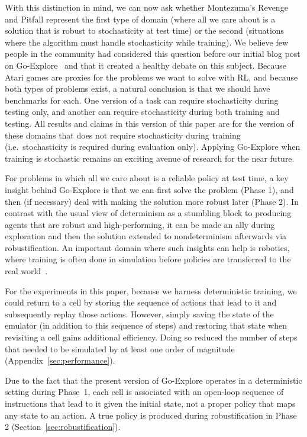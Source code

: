 \documentclass{article}
\begin{document}
With this distinction in mind, we can now ask whether Montezuma's Revenge and Pitfall represent the first type of domain (where all we care about is a solution that is robust to stochasticity at test time) or the second (situations where the algorithm must handle stochasticity while training). We believe few people in the community had considered this question before our initial blog post on Go-Explore~\cite{ecoffet:bloggoexplore2018} and that it created a healthy debate on this subject. Because Atari games are proxies for the problems we want to solve with RL, and because both types of problems exist, a natural conclusion is that we should have benchmarks for each. One version of a task can require stochasticity during testing only, and another can require stochasticity during both training and testing. All results and claims in this version of this paper are for the version of these domains that does not require stochasticity during training (i.e.\ stochasticity is required during evaluation only). Applying Go-Explore when training is stochastic remains an exciting avenue of research for the near future.

For problems in which all we care about is a reliable policy at test time, a key insight behind Go-Explore is that we can first solve the problem (Phase 1), and then (if necessary) deal with making the solution more robust later (Phase 2). In contrast with the usual view of determinism as a stumbling block to producing agents that are robust and high-performing, it can be made an ally during exploration and then the solution extended to nondeterminism afterwards via robustification. An important domain where such insights can help is robotics, where training is often done in simulation before policies are transferred to the real world~\cite{koos2013transferability,cully:nature15,andrychowicz2018learning}.

For the experiments in this paper, because we harness deterministic training, we could return to a cell by storing the sequence of actions that lead to it and subsequently replay those actions. However, simply saving the state of the emulator (in addition to this sequence of steps) and restoring that state when revisiting a cell gains additional efficiency. Doing so reduced the number of steps that needed to be simulated by at least one order of magnitude (Appendix~\ref{sec:performance}).

Due to the fact that the present version of Go-Explore operates in a deterministic setting during Phase~1, each cell is associated with an open-loop sequence of instructions that lead to it given the initial state, not a proper policy that maps any state to an action. A true policy is produced during robustification in Phase 2 (Section~\ref{sec:robustification}).
\end{document}

